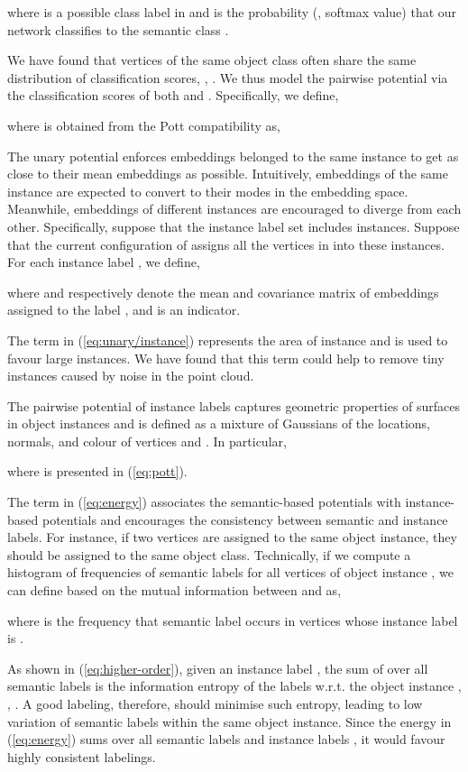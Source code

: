 \documentclass[10pt,twocolumn,letterpaper]{article}
\begin{document}
where  is a possible class label in  and  is the
probability (\eg, softmax value) that our network classifies  to the
semantic class .

We have found that vertices of the same object class often share the same
distribution of classification scores, \ie, . We thus model the
pairwise potential  via the classification scores of both
 and . Specifically, we define,

where  is obtained from the Pott compatibility as,


The unary potential  enforces embeddings belonged to the same
instance to get as close to their mean embeddings as possible. Intuitively,
embeddings of the same instance are expected to convert to their modes in the
embedding space. Meanwhile, embeddings of different instances are encouraged to
diverge from each other. Specifically, suppose that the instance label set
 includes  instances. Suppose that the current
configuration of  assigns all the vertices in  into these 
instances. For each instance label , we define,

where  and  respectively denote the mean
and covariance matrix of embeddings assigned to the label , and  is
an indicator.

The term  in (\ref{eq:unary/instance}) represents the area
of instance  and is used to favour large instances. We have found that this
term could help to remove tiny instances caused by noise in the point cloud.

The pairwise potential of instance labels  captures
geometric properties of surfaces in object instances and is defined as a mixture
of Gaussians of the locations, normals, and colour of vertices  and
. In particular,

where  is presented in (\ref{eq:pott}).

The term  in (\ref{eq:energy}) associates the semantic-based
potentials with instance-based potentials and encourages the consistency between
semantic and instance labels. For instance, if two vertices are assigned to the
same object instance, they should be assigned to the same object
class. Technically, if we compute a histogram  of frequencies of semantic
labels  for all vertices of object instance , we can define 
based on the mutual information between  and  as,

where  is the frequency that semantic label  occurs in vertices whose
instance label is .

As shown in (\ref{eq:higher-order}), given an instance label , the sum of
 over all semantic labels  is the information entropy of the
labels  w.r.t. the object instance , \ie,
. A good labeling,
therefore, should minimise such entropy, leading to low variation of semantic
labels within the same object instance. Since the energy  in
(\ref{eq:energy}) sums over all semantic labels  and instance labels , it
would favour highly consistent labelings.
\end{document}

